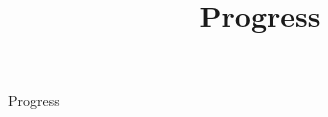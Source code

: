 \documentclass{article}
\title{Progress}
\begin{document}
\begin{center}
    {\huge{Progress}}
\end{center}    
    \begin{multicols}{2}
    
    \end{multicols}
\end{document}
